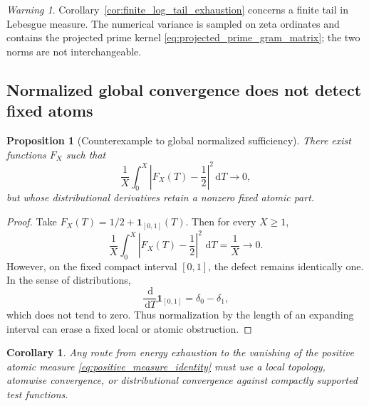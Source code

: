 \documentclass[11pt]{amsart}
\numberwithin{equation}{section}
\theoremstyle{plain}
\newtheorem{proposition}[theorem]{Proposition}
\newtheorem{corollary}[theorem]{Corollary}
\theoremstyle{definition}
\theoremstyle{remark}
\newtheorem{warning}[theorem]{Warning}
\newcommand{\1}{\mathbf{1}}
\newcommand{\dd}{\,\mathrm{d}}
\begin{document}
\begin{warning}
\label{warn:finite_tail_not_full_residual}
Corollary~\ref{cor:finite_log_tail_exhaustion} concerns a finite tail in
Lebesgue measure.  The numerical variance is sampled on zeta ordinates and
contains the projected prime kernel \eqref{eq:projected_prime_gram_matrix}; the two norms are
not interchangeable.
\end{warning}

\subsection{Normalized global convergence does not detect fixed atoms}
\label{subsec:global_not_local}

\begin{proposition}[Counterexample to global normalized sufficiency]
\label{prop:global_normalized_counterexample}
There exist functions $F_X$ such that
\begin{equation}
\frac1X\int_0^X
\left|F_X(T)-\frac12\right|^2\dd T
\longrightarrow0,
\label{eq:global_normalized_convergence}
\end{equation}
but whose distributional derivatives retain a nonzero fixed atomic part.
\end{proposition}

\begin{proof}
Take \(F_X(T)=1/2+\1_{[0,1]}(T)\).  Then for every \(X\geq1\),
\begin{equation}
\frac1X\int_0^X\left|F_X(T)-\frac12\right|^2\,\dd T
=
\frac1X\longrightarrow0.
\label{eq:global_counterexample_mean}
\end{equation}
However, on the fixed compact interval \([0,1]\), the defect remains
identically one.  In the sense of distributions,
\begin{equation}
\frac{\dd}{\dd T}\1_{[0,1]}
=
\delta_0-\delta_1,
\label{eq:global_counterexample_derivative}
\end{equation}
which does not tend to zero.  Thus normalization by the length of an
expanding interval can erase a fixed local or atomic obstruction.
\end{proof}

\begin{corollary}
\label{cor:local_topology_required}
Any route from energy exhaustion to the vanishing of the positive atomic
measure \eqref{eq:positive_measure_identity} must use a local topology,
atomwise convergence, or distributional convergence against compactly
supported test functions.
\end{corollary}
\end{document}
